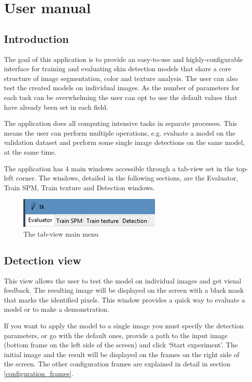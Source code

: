 \documentclass[12pt]{report}
\begin{document}
	\section{User manual}
	\subsection{Introduction}
	The goal of this application is to provide an easy-to-use and highly-configurable interface for training and evaluating skin detection models that share a core structure of image segmentation, color and texture analysis. The user can also test the created models on individual images. As the number of parameters for each task can be overwhelming the user can opt to use the default values that have already been set in each field.
	
	The application does all computing intensive tasks in separate processes. This means the user can perform multiple operations, e.g. evaluate a model on the validation dataset and perform some single image detections on the same model, at the same time.
	
	The application has 4 main windows accessible through a tab-view set in the top-left corner. The windows, detailed in the following sections, are the Evaluator, Train SPM, Train texture and Detection windows.
	
	\begin{figure}[h]
		\centering
		\includegraphics{manual/tab_view.png}
		\caption{The tab-view main menu}
	\end{figure}
	
	\subsection{Detection view}
	This view allows the user to test the model on individual images and get visual feedback. The resulting image will be displayed on the screen with a black mask that marks the identified pixels. This window provides a quick way to evaluate a model or to make a demonstration.
	
	If you want to apply the model to a single image you must specify the detection parameters, or go with the default ones, provide a path to the input image (bottom frame on the left side of the screen) and click ‘Start experiment’. The initial image and the result will be displayed on the frames on the right side of the screen. The other configuration frames are explained in detail in section \ref{configuration_frames}. 
	
\end{document}
